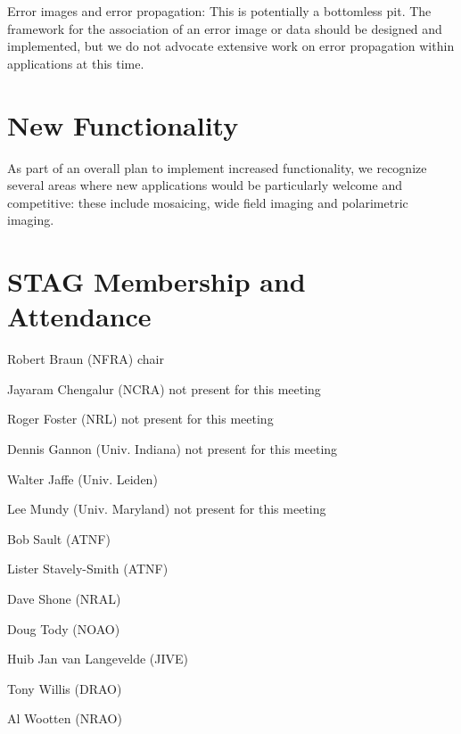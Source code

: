 Error images and error propagation: This is potentially a bottomless
pit. The framework for the association of an error image or data
should be designed and implemented, but we do not advocate extensive
work on error propagation within applications at this time.

\section{New Functionality}

As part of an overall plan to implement increased functionality, we
recognize several areas where new applications would be
particularly welcome and competitive: these include mosaicing, wide
field imaging and polarimetric imaging.

\section{STAG Membership and Attendance}
\parindent=0cm

Robert Braun (NFRA) chair

Jayaram Chengalur (NCRA) not present for this meeting

Roger Foster (NRL) not present for this meeting

Dennis Gannon (Univ. Indiana) not present for this meeting

Walter Jaffe (Univ. Leiden)

Lee Mundy (Univ. Maryland) not present for this meeting

Bob Sault (ATNF)

Lister Stavely-Smith (ATNF)

Dave Shone (NRAL)

Doug Tody (NOAO)

Huib Jan van Langevelde (JIVE)

Tony Willis (DRAO)

Al Wootten (NRAO)

